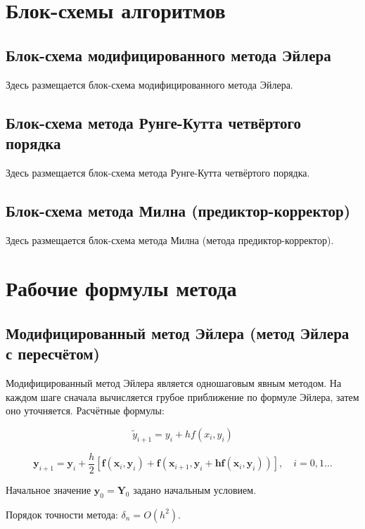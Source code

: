 \section{Блок-схемы алгоритмов}

\subsection{Блок-схема модифицированного метода Эйлера}

Здесь размещается блок-схема модифицированного метода Эйлера.

\subsection{Блок-схема метода Рунге-Кутта четвёртого порядка}

Здесь размещается блок-схема метода Рунге-Кутта четвёртого порядка.

\subsection{Блок-схема метода Милна (предиктор-корректор)}

Здесь размещается блок-схема метода Милна (метода предиктор-корректор).

\section{Рабочие формулы метода}

\subsection{Модифицированный метод Эйлера (метод Эйлера с пересчётом)}

Модифицированный метод Эйлера является одношаговым явным методом. На каждом шаге сначала вычисляется грубое приближение по формуле Эйлера, затем оно уточняется. Расчётные формулы:

\[
\tilde{y}_{i+1} = y_i + h f(x_i, y_i)
\]

\[
\mathbf{y}_{i+1} = \mathbf{y}_i + \frac{h}{2}\left[ \mathbf{f}\left(\mathbf{x}_i, \mathbf{y}_i\right) + \mathbf{f}\left(\mathbf{x}_{i+1}, \mathbf{y}_i + \mathbf{h f}\left(\mathbf{x}_i, \mathbf{y}_i\right)\right) \right], \quad i = 0, 1 \dots
\]

Начальное значение $\mathbf{y}_0 = \mathbf{Y}_0$ задано начальным условием.

Порядок точности метода: $\delta_n = O(h^2)$.

